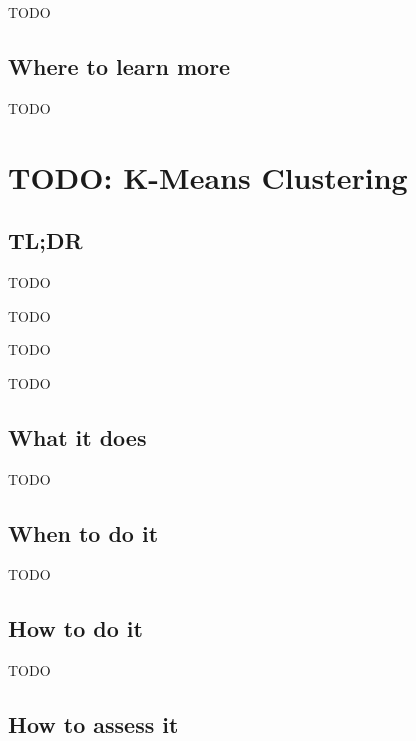 \documentclass[
]{book}
\providecommand{\tightlist}{%
  \setlength{\itemsep}{0pt}\setlength{\parskip}{0pt}}
\begin{document}
TODO

\hypertarget{where-to-learn-more-21}{%
\section{Where to learn more}\label{where-to-learn-more-21}}

TODO

\hypertarget{k-means-clustering}{%
\chapter{TODO: K-Means Clustering}\label{k-means-clustering}}

\hypertarget{tldr-22}{%
\section{TL;DR}\label{tldr-22}}

\begin{description}
\tightlist
\item[What it does]
TODO
\item[When to do it]
TODO
\item[How to do it]
TODO
\item[How to assess it]
TODO
\end{description}

\hypertarget{what-it-does-22}{%
\section{What it does}\label{what-it-does-22}}

TODO

\hypertarget{when-to-do-it-22}{%
\section{When to do it}\label{when-to-do-it-22}}

TODO

\hypertarget{how-to-do-it-22}{%
\section{How to do it}\label{how-to-do-it-22}}

TODO

\hypertarget{how-to-assess-it-22}{%
\section{How to assess it}\label{how-to-assess-it-22}}
\end{document}
